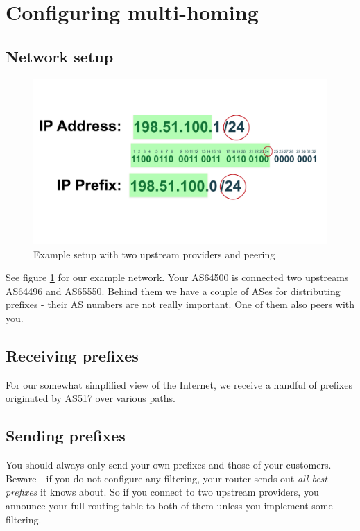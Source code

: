 \section{Configuring multi-homing}
\subsection{Network setup}
\begin{figure}
  \centering
  \includegraphics[width=\linewidth,page=3]{img/Drawings.pdf}
  \caption{Example setup with two upstream providers and peering}
  \label{fig:multihoming}
\end{figure}
See figure \ref{fig:multihoming} for our example network. Your AS64500 is connected two upstreams AS64496 and AS65550. Behind them we have a couple of ASes for distributing prefixes - their AS numbers are not really important. One of them also peers with you.

\subsection{Receiving prefixes}
For our somewhat simplified view of the Internet, we receive a handful of prefixes originated by AS517 over various paths.

\subsection{Sending prefixes}
You should always only send your own prefixes and those of your customers. Beware - if you do not configure any filtering, your router sends out \emph{all best prefixes} it knows about. So if you connect to two upstream providers, you announce  your full routing table to both of them unless you implement some filtering.

